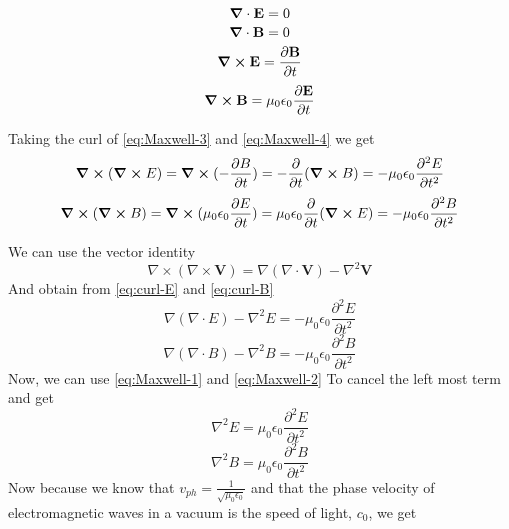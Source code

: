 \documentclass{article}
\numberwithin{equation}{section}
\begin{document}
\begin{equation}
    \label{eq:Maxwell-1}
    \grad \cdot \textbf{E} = 0
\end{equation}
\begin{equation}
    \label{eq:Maxwell-2}
    \grad \cdot \textbf{B} = 0
\end{equation}
\begin{equation}
    \label{eq:Maxwell-3}
    \grad \cross \textbf{E} = \frac{\partial\textbf{B}}{\partial t}
\end{equation}
\begin{equation}
    \label{eq:Maxwell-4}
    \grad \cross \textbf{B} = \mu_0 \epsilon_0 \frac{\partial\textbf{E}}{\partial t}
\end{equation}

Taking the curl of \ref{eq:Maxwell-3} and \ref{eq:Maxwell-4} we get
\begin{equation}
    \label{eq:curl-E}
    \curl{(\curl{E})} = \curl{(-\frac{\partial B}{\partial t})} = -\frac{\partial}{\partial t}(\curl{B}) = - \mu_0 \epsilon_0 \frac{\partial^2 E}{\partial t^2}
\end{equation}
\begin{equation}
    \label{eq:curl-B}
    \curl{(\curl{B})} = \curl{(\mu_0 \epsilon_0 \frac{\partial E}{\partial t})} = \mu_0 \epsilon_0\frac{\partial}{\partial t}(\curl{E}) = - \mu_0 \epsilon_0 \frac{\partial^2 B}{\partial t^2}
\end{equation}

We can use the vector identity
\begin{equation}
    \nabla \times \left( \nabla \times \mathbf{V} \right) = \nabla \left( \nabla \cdot \mathbf{V} \right) - \nabla^2 \mathbf{V}
\end{equation}
And obtain from \ref{eq:curl-E} and \ref{eq:curl-B}
\begin{equation}
    \nabla(\nabla \cdot E) - \nabla^2 E = -\mu_0\epsilon_0\frac{\partial^2 E}{\partial t^2}
\end{equation}
\begin{equation}
    \nabla(\nabla \cdot B) - \nabla^2 B = -\mu_0\epsilon_0\frac{\partial^2 B}{\partial t^2}
\end{equation}
Now, we can use \ref{eq:Maxwell-1} and \ref{eq:Maxwell-2} To cancel the left most term and get
\begin{equation}
    \nabla^2 E = \mu_0\epsilon_0\frac{\partial^2 E}{\partial t^2}
\end{equation}
\begin{equation}
    \nabla^2 B = \mu_0\epsilon_0\frac{\partial^2 B}{\partial t^2}
\end{equation}
Now because we know that $v_{ph} = \frac{1}{\sqrt{\mu_0\epsilon_0}}$ and that the phase velocity of electromagnetic waves in a vacuum is the speed of light, $c_0$, we get
\end{document}

